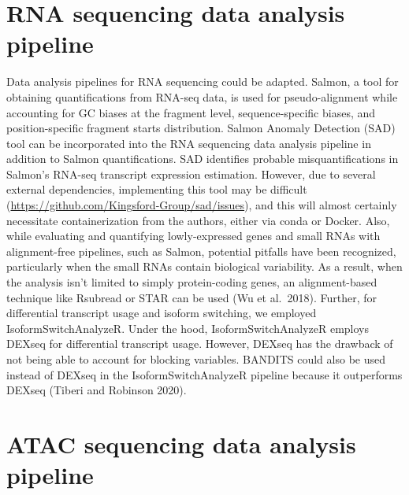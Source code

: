 \documentclass[12pt,twoside]{reedthesis}
\begin{document}
\hypertarget{rna-sequencing-data-analysis-pipeline}{%
\section*{RNA sequencing data analysis pipeline}\label{rna-sequencing-data-analysis-pipeline}}

Data analysis pipelines for RNA sequencing could be adapted. Salmon, a tool for obtaining quantifications from RNA-seq data, is used for pseudo-alignment while accounting for GC biases at the fragment level, sequence-specific biases, and position-specific fragment starts distribution. Salmon Anomaly Detection (SAD) tool can be incorporated into the RNA sequencing data analysis pipeline in addition to Salmon quantifications. SAD identifies probable misquantifications in Salmon's RNA-seq transcript expression estimation. However, due to several external dependencies, implementing this tool may be difficult (\url{https://github.com/Kingsford-Group/sad/issues}), and this will almost certainly necessitate containerization from the authors, either via conda or Docker. Also, while evaluating and quantifying lowly-expressed genes and small RNAs with alignment-free pipelines, such as Salmon, potential pitfalls have been recognized, particularly when the small RNAs contain biological variability. As a result, when the analysis isn't limited to simply protein-coding genes, an alignment-based technique like Rsubread or STAR can be used (Wu et al.~2018). Further, for differential transcript usage and isoform switching, we employed IsoformSwitchAnalyzeR. Under the hood, IsoformSwitchAnalyzeR employs DEXseq for differential transcript usage. However, DEXseq has the drawback of not being able to account for blocking variables. BANDITS could also be used instead of DEXseq in the IsoformSwitchAnalyzeR pipeline because it outperforms DEXseq (Tiberi and Robinson 2020).

\hypertarget{atac-sequencing-data-analysis-pipeline}{%
\section*{ATAC sequencing data analysis pipeline}\label{atac-sequencing-data-analysis-pipeline}}
\end{document}
